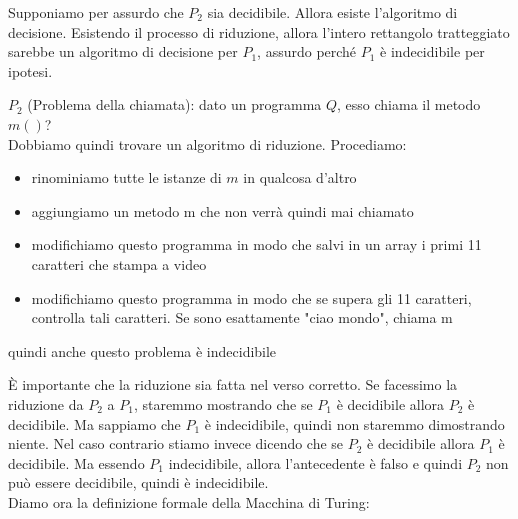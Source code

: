 Supponiamo per assurdo che $P_2$ sia decidibile. Allora esiste l'algoritmo di decisione. Esistendo il
processo di riduzione, allora l'intero rettangolo tratteggiato sarebbe un algoritmo di decisione per
$P_1$, assurdo perché $P_1$ è indecidibile per ipotesi.
\begin{example}
$P_2$ (Problema della chiamata): dato un programma $Q$, esso chiama il metodo $m()$?
\\Dobbiamo quindi trovare un algoritmo di riduzione. Procediamo:
\begin{itemize}
\item rinominiamo tutte le istanze di $m$ in qualcosa d'altro
\item aggiungiamo un metodo m che non verrà quindi mai chiamato
\item modifichiamo questo programma in modo che salvi in un array i primi 11 caratteri che stampa a video
\item modifichiamo questo programma in modo che se supera gli 11 caratteri, controlla tali caratteri. Se sono esattamente "ciao mondo", chiama m
\end{itemize}
quindi anche questo problema è indecidibile
\end{example}
È importante che la riduzione sia fatta nel verso corretto. Se facessimo la riduzione da $P_2$ a $P_1$,
staremmo mostrando che se $P_1$ è decidibile allora $P_2$ è decidibile. Ma sappiamo che $P_1$ è
indecidibile, quindi non staremmo dimostrando niente.
Nel caso contrario stiamo invece dicendo che se $P_2$ è decidibile allora $P_1$ è decidibile. Ma essendo
$P_1$ indecidibile, allora l'antecedente è falso e quindi $P_2$ non può essere decidibile, quindi è
indecidibile.\\
Diamo ora la definizione formale della Macchina di Turing:
